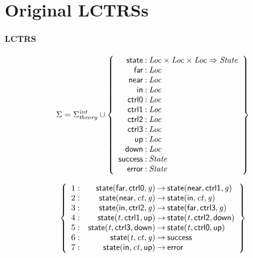 \documentclass[a4paper]{article}
\newcommand{\Sort}[1]{\mathit{#1}}
\newcommand{\symb}[1]{\mathsf{#1}}
\newcommand{\var}[1]{\mathit{#1}}
\newcommand{\Sigmainttheory}{\Sigma^{\mathit{int}}_{\mathit{theory}}}
\begin{document}

\section*{Original LCTRSs}

\paragraph{LCTRS}

\[
\Sigma = 
\Sigmainttheory \cup\left\{
\begin{array}{r@{\>}c@{\>}l}
\symb{state} & : & \Sort{Loc} \times \Sort{Loc} \times \Sort{Loc} \Rightarrow \Sort{State}\\
\symb{far} & : & \Sort{Loc}\\
\symb{near} & : & \Sort{Loc}\\
\symb{in} & : & \Sort{Loc}\\
\symb{ctrl0} & : & \Sort{Loc}\\
\symb{ctrl1} & : & \Sort{Loc}\\
\symb{ctrl2} & : & \Sort{Loc}\\
\symb{ctrl3} & : & \Sort{Loc}\\
\symb{up} & : & \Sort{Loc}\\
\symb{down} & : & \Sort{Loc}\\
\symb{success} & : & \Sort{State}\\
\symb{error} & : & \Sort{State}\\
\end{array}
\right\}
\]

\[
\left\{
\begin{array}{rr@{\>}c@{\>}ll}
\mathrm{1} : 
 & \symb{state}(\symb{far},\symb{ctrl0},\var{g})
 & \to 
 & \symb{state}(\symb{near},\symb{ctrl1},\var{g})\\

\mathrm{2} : 
 & \symb{state}(\symb{near},\var{ct},\var{g})
 & \to 
 & \symb{state}(\symb{in},\var{ct},\var{g})\\

\mathrm{3} : 
 & \symb{state}(\symb{in},\symb{ctrl2},\var{g})
 & \to 
 & \symb{state}(\symb{far},\symb{ctrl3},\var{g})\\

\mathrm{4} : 
 & \symb{state}(\var{t},\symb{ctrl1},\symb{up})
 & \to 
 & \symb{state}(\var{t},\symb{ctrl2},\symb{down})\\

\mathrm{5} : 
 & \symb{state}(\var{t},\symb{ctrl3},\symb{down})
 & \to 
 & \symb{state}(\var{t},\symb{ctrl0},\symb{up})\\

\mathrm{6} : 
 & \symb{state}(\var{t},\var{ct},\var{g})
 & \to 
 & \symb{success}\\

\mathrm{7} : 
 & \symb{state}(\symb{in},\var{ct},\symb{up})
 & \to 
 & \symb{error}\\

\end{array}
\right\}
\]
\end{document}
